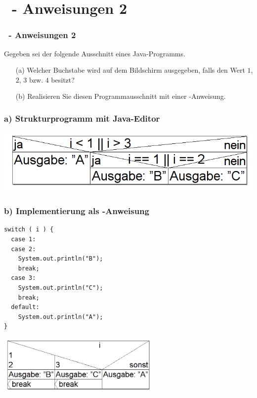 \def\stitle{\theexercise\ - Anweisungen 2}
\section{\stitle}
\begin{frame}[t]%
    \frametitle{\stitle}

Gegeben sei der folgende Ausschnitt eines Java-Programms.


\begin{itemize}
\item[(a)] Welcher Buchstabe wird auf dem Bildschirm ausgegeben, falls  den Wert $1$, $2$, $3$ bzw. $4$ besitzt?
\item[(b)] Realisieren Sie diesen Programmausschnitt mit einer -Anweisung.
\end{itemize}
\end{frame}


\begin{frame}[fragile]%
 \frametitle{a) Strukturprogramm mit Java-Editor}%

\begin{center}

\includegraphics[width=1\textwidth]{anweis-2/Bilder/Struktogramm_a}
\end{center}
\end{frame}


\begin{frame}[fragile]%
 \frametitle{b) Implementierung als -Anweisung}%

\begin{center}
\begin{minipage}{0.7\textwidth}
\begin{lstlisting}[style=JAVA]
switch ( i ) {
  case 1:
  case 2:
    System.out.println("B");
    break;
  case 3:
    System.out.println("C");
    break;
  default:
    System.out.println("A");
}
\end{lstlisting}

\end{minipage}

\includegraphics[width=0.6\textwidth]{anweis-2/Bilder/Struktogramm_b}
\end{center}

\end{frame}

